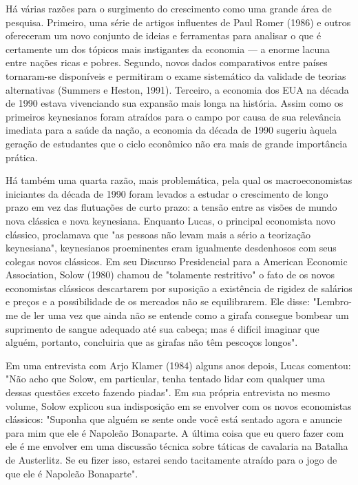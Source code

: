 \documentclass[12pt]{article}
\begin{document}
Há várias razões para o surgimento do crescimento como uma grande área de pesquisa. Primeiro, uma série de artigos influentes de Paul Romer (1986) e outros ofereceram um novo conjunto de ideias e ferramentas para analisar o que é certamente um dos tópicos mais instigantes da economia — a enorme lacuna entre nações ricas e pobres. Segundo, novos dados comparativos entre países tornaram-se disponíveis e permitiram o exame sistemático da validade de teorias alternativas (Summers e Heston, 1991). Terceiro, a economia dos EUA na década de 1990 estava vivenciando sua expansão mais longa na história. Assim como os primeiros keynesianos foram atraídos para o campo por causa de sua relevância imediata para a saúde da nação, a economia da década de 1990 sugeriu àquela geração de estudantes que o ciclo econômico não era mais de grande importância prática.

Há também uma quarta razão, mais problemática, pela qual os macroeconomistas iniciantes da década de 1990 foram levados a estudar o crescimento de longo prazo em vez das flutuações de curto prazo: a tensão entre as visões de mundo nova clássica e nova keynesiana. Enquanto Lucas, o principal economista novo clássico, proclamava que "as pessoas não levam mais a sério a teorização keynesiana", keynesianos proeminentes eram igualmente desdenhosos com seus colegas novos clássicos. Em seu Discurso Presidencial para a American Economic Association, Solow (1980) chamou de "tolamente restritivo" o fato de os novos economistas clássicos descartarem por suposição a existência de rigidez de salários e preços e a possibilidade de os mercados não se equilibrarem. Ele disse: "Lembro-me de ler uma vez que ainda não se entende como a girafa consegue bombear um suprimento de sangue adequado até sua cabeça; mas é difícil imaginar que alguém, portanto, concluiria que as girafas não têm pescoços longos".

Em uma entrevista com Arjo Klamer (1984) alguns anos depois, Lucas comentou: "Não acho que Solow, em particular, tenha tentado lidar com qualquer uma dessas questões exceto fazendo piadas". Em sua própria entrevista no mesmo volume, Solow explicou sua indisposição em se envolver com os novos economistas clássicos: "Suponha que alguém se sente onde você está sentado agora e anuncie para mim que ele é Napoleão Bonaparte. A última coisa que eu quero fazer com ele é me envolver em uma discussão técnica sobre táticas de cavalaria na Batalha de Austerlitz. Se eu fizer isso, estarei sendo tacitamente atraído para o jogo de que ele é Napoleão Bonaparte".
\end{document}
